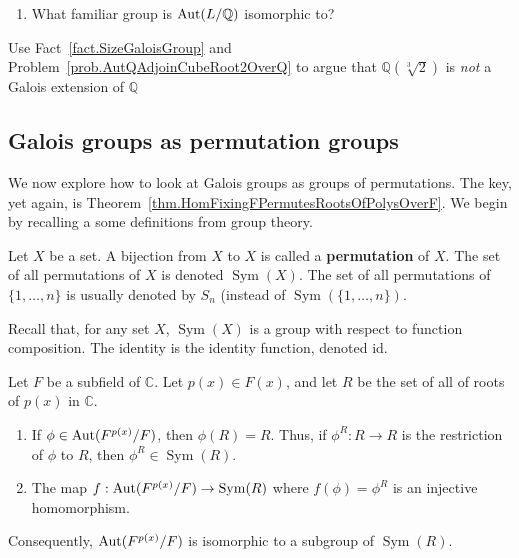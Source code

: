 \begin{problem}
\begin{center}
\end{center}
\begin{enumerate}[resume]
\item What familiar group is $\operatorname{Aut}(L/\mathbb{Q})$ isomorphic to?
\end{enumerate}
\end{problem}

\begin{problem}\label{prob.QAdjoinCubeRoot2OverQNotGalois}
Use Fact~\ref{fact.SizeGaloisGroup} and Problem~\ref{prob.AutQAdjoinCubeRoot2OverQ} to argue that  $\mathbb{Q}(\sqrt[3]{2})$ is \emph{not} a Galois extension of $\mathbb{Q}$ 
\end{problem}

\subsection{Galois groups as permutation groups}
We now explore how to look at Galois groups as groups of permutations. The key, yet again, is Theorem~\ref{thm.HomFixingFPermutesRootsOfPolysOverF}. We begin by recalling a some definitions from group theory.

\begin{definition}
Let $X$ be a set. A bijection from $X$ to $X$ is called a \textbf{permutation} of $X$. The set of all permutations of $X$ is denoted $\operatorname{Sym}(X)$. 
The set of all permutations of $\{1,\ldots,n\}$ is usually denoted by $S_n$ (instead of $\operatorname{Sym}(\{1,\ldots,n\})$.
\end{definition}

Recall that, for any set $X$, $\operatorname{Sym}(X)$ is a group with respect to function composition. The identity is the identity function, denoted id.

\begin{theorem}\label{thm.GaloisGroupIsPermGroup}
Let $F$ be a subfield of $\mathbb{C}$. Let $p(x)\in F(x)$, and let $R$ be the set of all of roots of $p(x)$ in $\mathbb{C}$.  
\begin{enumerate} 
\item If $\phi \in \operatorname{Aut}(F^{p(x)}/F)$, then $\phi(R) = R$. Thus, if $\phi^R: R\rightarrow R$ is the restriction of $\phi$ to $R$, then  $\phi^R\in \operatorname{Sym}(R)$.
\item The map $f: \operatorname{Aut}(F^{p(x)}/F)\to \operatorname{Sym}(R)$ where $f(\phi)=\phi^R$  is an injective homomorphism. 
\end{enumerate}
Consequently, $\operatorname{Aut}(F^{p(x)}/F)$ is isomorphic to a subgroup of $\operatorname{Sym}(R)$.
\end{theorem}

